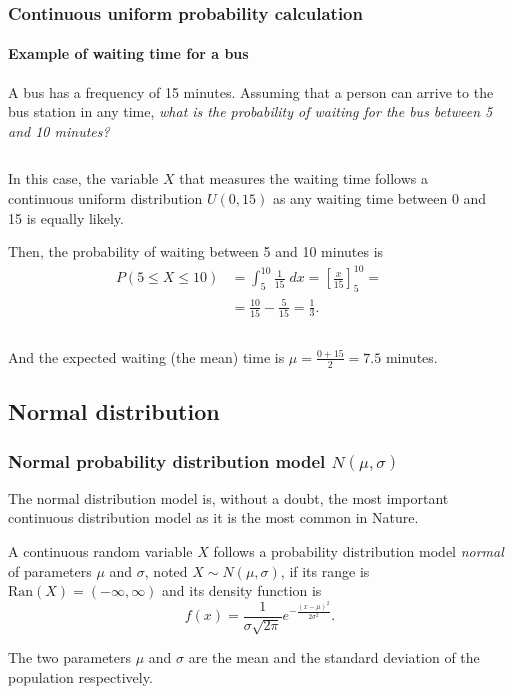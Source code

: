 \begin{frame}
\frametitle{Continuous uniform probability calculation}
\framesubtitle{Example of waiting time for a bus}
A bus has a frequency of 15 minutes. 
Assuming that a person can arrive to the bus station in any time, \emph{what is the probability of waiting for the bus between 5 and 10 minutes?}
\begin{columns}
\begin{column}{0.52\textwidth}
In this case, the variable $X$ that measures the waiting time follows a continuous uniform distribution $U(0,15)$ as any waiting time between 0 and 15 is equally likely. 

Then, the probability of waiting between 5 and 10 minutes is
\begin{align*}
P(5\leq X\leq 10) &= \int_{5}^{10} \frac{1}{15}\;dx = \left[\frac{x}{15}\right]_5^{10} = \\
&= \frac{10}{15}-\frac{5}{15} =\frac{1}{3}.
\end{align*}
\end{column}
\begin{column}{0.43\textwidth}
\begin{center}
\end{center}
\end{column}
\end{columns}
And the expected waiting (the mean) time is $\mu=\frac{0+15}{2}=7.5$ minutes.
\end{frame}


\subsection{Normal distribution}

\begin{frame}
\frametitle{Normal probability distribution model $N(\mu,\sigma)$}
The normal distribution model is, without a doubt, the most important continuous distribution model as it is the most common in Nature.
\begin{definition}
A continuous random variable $X$ follows a probability distribution model \emph{normal} of parameters $\mu$ and
$\sigma$, noted $X\sim N(\mu,\sigma)$, if its range is $\mbox{Ran}(X) = (-\infty,\infty)$ and its density function is
\[
f(x)= \frac{1}{\sigma\sqrt{2\pi}}e^{-\frac{(x-\mu)^2}{2\sigma^2}}.
\]
\end{definition}

The two parameters $\mu$ and $\sigma$ are the mean and the standard deviation of the population respectively. 
\end{frame}



